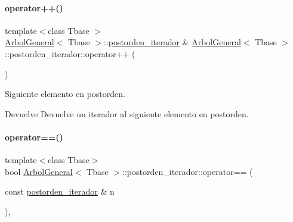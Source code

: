 \hypertarget{classArbolGeneral_1_1postorden__iterador_a3b2f2622714676de99e67aa27a410b68}{}\label{classArbolGeneral_1_1postorden__iterador_a3b2f2622714676de99e67aa27a410b68} 
\paragraph{\texorpdfstring{operator++()}{operator++()}}
{\footnotesize\ttfamily template$<$class Tbase $>$ \\
\hyperlink{classArbolGeneral}{Arbol\+General}$<$ Tbase $>$\+::\hyperlink{classArbolGeneral_1_1postorden__iterador}{postorden\+\_\+iterador} \& \hyperlink{classArbolGeneral}{Arbol\+General}$<$ Tbase $>$\+::postorden\+\_\+iterador\+::operator++ (\begin{DoxyParamCaption}{ }\end{DoxyParamCaption})\hspace{0.3cm}{\ttfamily [private]}}



Siguiente elemento en postorden. 

\begin{DoxyReturn}{Devuelve}
Devuelve un iterador al siguiente elemento en postorden. 
\end{DoxyReturn}
\hypertarget{classArbolGeneral_1_1postorden__iterador_a3c823a060b37ab5be8a950b5a79188d3}{}\label{classArbolGeneral_1_1postorden__iterador_a3c823a060b37ab5be8a950b5a79188d3} 
\paragraph{\texorpdfstring{operator==()}{operator==()}}
{\footnotesize\ttfamily template$<$class Tbase$>$ \\
bool \hyperlink{classArbolGeneral}{Arbol\+General}$<$ Tbase $>$\+::postorden\+\_\+iterador\+::operator== (\begin{DoxyParamCaption}\item[{const \hyperlink{classArbolGeneral_1_1postorden__iterador}{postorden\+\_\+iterador} \&}]{n }\end{DoxyParamCaption})\hspace{0.3cm}{\ttfamily [inline]}, {\ttfamily [private]}}



